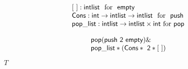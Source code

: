 \documentclass[10pt]{book}
\begin{document}
\begin{mdSnippets}
\begin{mdDisplaySnippet}[cc58b2c7d12911175f7fb796802cbc38]
\[%
\begin{array}{l}
{ \sf [ \ ]: intlist} \ \  \text{for}\ \ {\sf empty}\\
  {\sf Cons: int \rightarrow intlist\rightarrow intlist}\ \  \text{for} \ \ {\sf push}\\
{\sf pop\_list: intlist\rightarrow intlist\times int }\  \text{for}\  {\sf pop}
\end{array}
\]%
\end{mdDisplaySnippet}%
\begin{mdDisplaySnippet}[74574fa0f96861ef77af86c05361f99b]%
\[%
\begin {array}{l}
{\sf pop (push\ 2 \ empty)} \&  \\
{\sf pop\_list*(Cons*\ 2 * [\ ])}
\end{array}
\]%
\end{mdDisplaySnippet}%
\begin{mdInlineSnippet}%
$T$\end{mdInlineSnippet}%

\end{mdSnippets}
\end{document}
